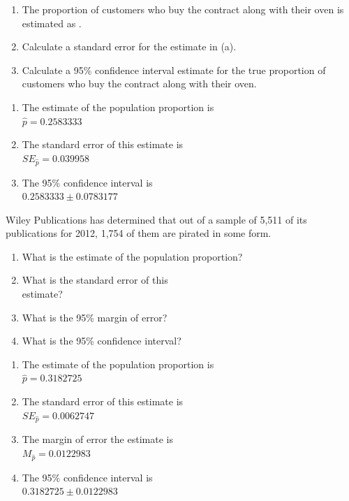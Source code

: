 \documentclass[11pt, chapterprefix=true]{scrbook}\usepackage[]{graphicx}\usepackage[]{color}
\begin{document}
\begin{exercises}
\begin{exercise}
\begin{enumerate}
\item	The proportion of customers who buy the contract along with their oven is estimated as \underline{\phantom{xxxxxxxxxx}}.
\item	Calculate a standard error for the estimate in (a).
\item	Calculate a 95\% confidence interval estimate for the true proportion of customers who buy the contract along with their oven.
\end{enumerate}
\end{exercise}
\begin{solution} %


\begin{enumerate}
\item	The estimate of the population proportion is \\ $\hat{p} = 0.2583333$
\item	The standard error of this estimate is \\ $SE_{\hat{p}} = 0.039958$
\item	The 95\% confidence interval is \\ $0.2583333 \pm 0.0783177$
\end{enumerate}
\end{solution}

\begin{exercise} %

Wiley Publications has determined that out of a sample of 5,511 of its publications for 2012, 1,754 of them are pirated in some form.

\begin{enumerate}
\item	What is the estimate of the population proportion?
\item	What is the standard error of this \\ estimate?
\item	What is the 95\% margin of error?
\item	What is the 95\% confidence interval?
\end{enumerate}
\end{exercise}
\begin{solution} %


\begin{enumerate}
\item	The estimate of the population proportion is \\ $\hat{p} = 0.3182725$
\item	The standard error of this estimate is \\ $SE_{\hat{p}} = 0.0062747$
\item The margin of error the estimate is \\ $M_{\hat{p}} = 0.0122983$
\item	The 95\% confidence interval is \\ $0.3182725 \pm 0.0122983$
\end{enumerate}
\end{solution}


\end{exercises}
\end{document}
